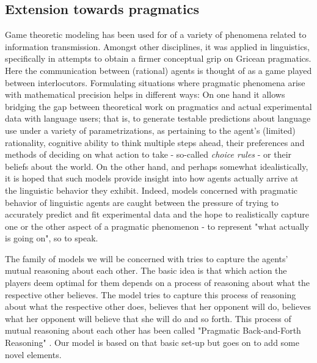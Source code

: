 \documentclass[10]{article}
\begin{document}
\subsection{Extension towards pragmatics}
Game theoretic modeling has been used for of a variety of phenomena related to information transmission. %
Amongst other disciplines, it was applied in linguistics, specifically in attempts to obtain a firmer conceptual grip on Gricean pragmatics. Here the communication between (rational) agents is thought of as a game played between interlocutors. Formulating situations where pragmatic phenomena arise with mathematical precision helps in different ways: On one hand it allows bridging the gap between theoretical work on pragmatics and actual experimental data with language users; that is, to generate testable predictions about language use under a variety of parametrizations, as pertaining to the agent's (limited) rationality, cognitive ability to think multiple steps ahead, their preferences and methods of deciding on what action to take - so-called \textit{choice rules} - or their beliefs about the world. On the other hand, and perhaps somewhat idealistically, it is hoped that such models provide insight into how agents actually arrive at the linguistic behavior they exhibit. Indeed, models concerned with pragmatic behavior of linguistic agents are caught between the pressure of trying to accurately predict and fit experimental data and the hope to realistically capture one or the other aspect of a pragmatic phenomenon - to represent "what actually is going on", so to speak.

The family of models we will be concerned with tries to capture the agents' mutual reasoning about each other. The basic idea is that which action the players deem optimal for them depends on a process of reasoning about what the respective other believes. The model tries to capture this process of reasoning about what the respective other does, believes that her opponent will do, believes what her opponent will believe that she will do and so forth. This process of mutual reasoning about each other has been called "Pragmatic Back-and-Forth Reasoning" \cite{franke2014pragmatic}. Our model is based on that basic set-up but goes on to add some novel elements.
\end{document}
